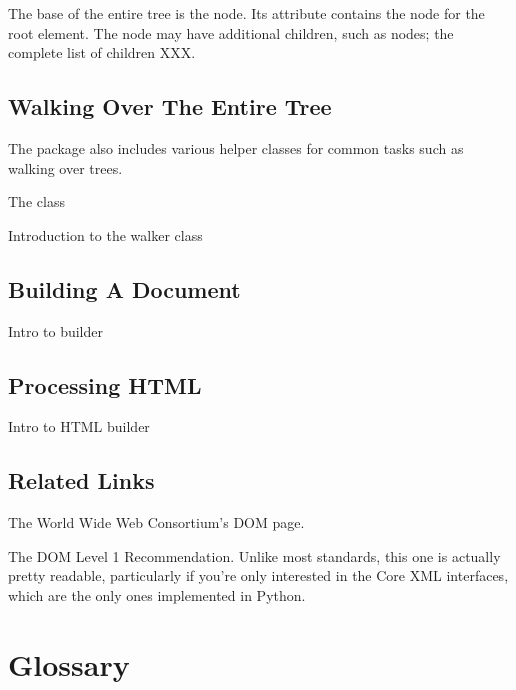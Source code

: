 \documentclass{howto}
\begin{document}
The base of the entire tree is the  node.  Its
 attribute contains the  node
for the root element.  The  node may have additional
children, such as  nodes; the complete list of children XXX.


\subsection{Walking Over The Entire Tree}

The  package also includes various helper classes for
common tasks such as walking over trees.

The  class

Introduction to the walker class

\subsection{Building A Document}

Intro to builder

\subsection{Processing HTML}

Intro to HTML builder


\subsection{Related Links}

\begin{definitions}
%
The World Wide Web Consortium's DOM page.

%
The DOM Level 1 Recommendation.  Unlike most standards, this one is
actually pretty readable, particularly if you're only interested in
the Core XML interfaces, which are the only ones implemented in
Python.  

\end{definitions}



\section{Glossary}
\end{document}

